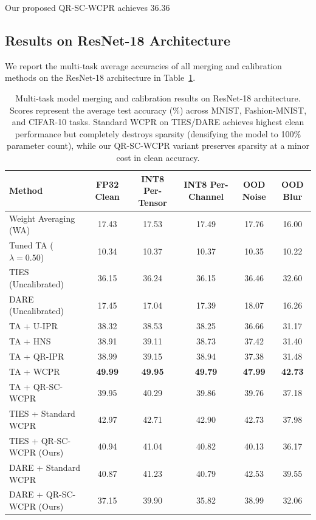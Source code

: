 \documentclass{article}
\theoremstyle{plain}
\theoremstyle{definition}
\theoremstyle{remark}
\begin{document}
Our proposed QR-SC-WCPR achieves 36.36%

\subsection{Results on ResNet-18 Architecture}
We report the multi-task average accuracies of all merging and calibration methods on the ResNet-18 architecture in Table~\ref{tab:resnet18_results}.

\begin{table}[t]
\caption{Multi-task model merging and calibration results on ResNet-18 architecture. Scores represent the average test accuracy (\%) across MNIST, Fashion-MNIST, and CIFAR-10 tasks. Standard WCPR on TIES/DARE achieves highest clean performance but completely destroys sparsity (densifying the model to 100\% parameter count), while our QR-SC-WCPR variant preserves sparsity at a minor cost in clean accuracy.}
\label{tab:resnet18_results}
\begin{center}
\begin{footnotesize}
\begin{tabular}{lccccc}
\toprule
\textbf{Method} & \textbf{FP32 Clean} & \textbf{INT8 Per-Tensor} & \textbf{INT8 Per-Channel} & \textbf{OOD Noise} & \textbf{OOD Blur} \\
\midrule
Weight Averaging (WA) & 17.43 & 17.53 & 17.49 & 17.76 & 16.00 \\
Tuned TA ($\lambda=0.50$) & 10.34 & 10.37 & 10.37 & 10.35 & 10.22 \\
\midrule
TIES (Uncalibrated) & 36.15 & 36.24 & 36.15 & 36.46 & 32.60 \\
DARE (Uncalibrated) & 17.45 & 17.04 & 17.39 & 18.07 & 16.26 \\
\midrule
TA + U-IPR & 38.32 & 38.53 & 38.25 & 36.66 & 31.17 \\
TA + HNS & 38.91 & 39.11 & 38.73 & 37.42 & 31.40 \\
TA + QR-IPR & 38.99 & 39.15 & 38.94 & 37.38 & 31.48 \\
TA + WCPR & \textbf{49.99} & \textbf{49.95} & \textbf{49.79} & \textbf{47.99} & \textbf{42.73} \\
TA + QR-SC-WCPR & 39.95 & 40.29 & 39.86 & 39.76 & 37.18 \\
\midrule
TIES + Standard WCPR & 42.97 & 42.71 & 42.90 & 42.73 & 37.98 \\
TIES + QR-SC-WCPR (Ours) & 40.94 & 41.04 & 40.82 & 40.13 & 36.17 \\
DARE + Standard WCPR & 40.87 & 41.23 & 40.79 & 42.53 & 39.55 \\
DARE + QR-SC-WCPR (Ours) & 37.15 & 39.90 & 35.82 & 38.99 & 32.06 \\
\bottomrule
\end{tabular}
\end{footnotesize}
\end{center}
\end{table}
\end{document}
